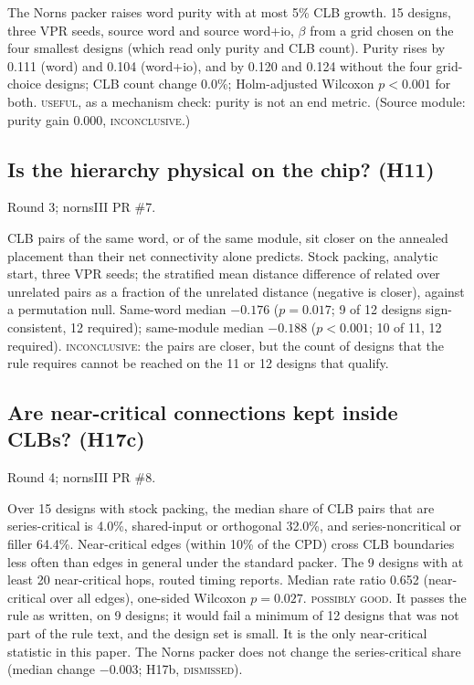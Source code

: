  The Norns packer raises word purity with at most 5\% CLB growth.
 15 designs, three VPR seeds, source word and source word+io, $\beta$ from a grid chosen on the four smallest designs (which read only purity and CLB count).
 Purity rises by 0.111 (word) and 0.104 (word+io), and by 0.120 and 0.124 without the four grid-choice designs; CLB count change 0.0\%; Holm-adjusted Wilcoxon $p<0.001$ for both. %
 \textsc{useful}, as a mechanism check: purity is not an end metric. (Source module: purity gain 0.000, \textsc{inconclusive}.)

\subsection{Is the hierarchy physical on the chip? (H11)}
\label{sec:e-hier}

 Round 3; nornsIII PR \#7.

 CLB pairs of the same word, or of the same module, sit closer on the annealed placement than their net connectivity alone predicts.
 Stock packing, analytic start, three VPR seeds; the stratified mean distance difference of related over unrelated pairs as a fraction of the unrelated distance (negative is closer), against a permutation null.
 Same-word median $-0.176$ ($p=0.017$; 9 of 12 designs sign-consistent, 12 required); same-module median $-0.188$ ($p<0.001$; 10 of 11, 12 required). %
 \textsc{inconclusive}: the pairs are closer, but the count of designs that the rule requires cannot be reached on the 11 or 12 designs that qualify.

\subsection{Are near-critical connections kept inside CLBs? (H17c)}
\label{sec:e-census}

 Round 4; nornsIII PR \#8.

 Over 15 designs with stock packing, the median share of CLB pairs that are series-critical is 4.0\%, shared-input or orthogonal 32.0\%, and series-noncritical or filler 64.4\%. %
 Near-critical edges (within 10\% of the CPD) cross CLB boundaries less often than edges in general under the standard packer.
 The 9 designs with at least 20 near-critical hops, routed timing reports.
 Median rate ratio 0.652 (near-critical over all edges), one-sided Wilcoxon $p=0.027$. %
 \textsc{possibly good}. It passes the rule as written, on 9 designs; it would fail a minimum of 12 designs that was not part of the rule text, and the design set is small. It is the only near-critical statistic in this paper. The Norns packer does not change the series-critical share (median change $-0.003$; H17b, \textsc{dismissed}).

